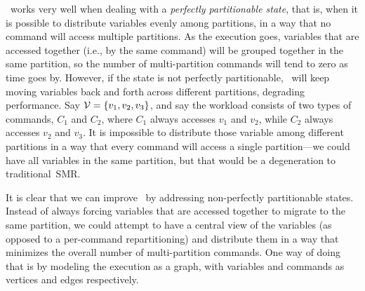 \dssmr\ works very well when dealing with a \emph{perfectly partitionable state}, that is, when it is possible to distribute variables evenly among partitions, in a way that no command will access multiple partitions.
As the execution goes, variables that are accessed together (i.e., by the same command) will be grouped together in the same partition, so the number of multi-partition commands will tend to zero as time goes by.
However, if the state is not perfectly partitionable, \dssmr\ will keep moving variables back and forth across different partitions, degrading performance.
Say $\mathcal{V} = \{v_1, v_2, v_3\}$, and say the workload consists of two types of commands, $C_1$ and $C_2$, where $C_1$ always accesses $v_1$ and $v_2$, while $C_2$ always accesses $v_2$ and $v_3$.
It is impossible to distribute those variable among different partitions in a way that every command will access a single partition---we could have all variables in the same partition, but that would be a degeneration to traditional~SMR.

It is clear that we can improve \dssmr\ by addressing non-perfectly partitionable states.
Instead of always forcing variables that are accessed together to migrate to the same partition, we could attempt to have a central view of the variables (as opposed to a per-command repartitioning) and distribute them in a way that minimizes the overall number of multi-partition commands.
One way of doing that is by modeling the execution as a graph, with variables and commands as vertices and edges respectively.



